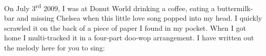 On July 3\textsuperscript{rd} 2009, I was at Donut World drinking a coffee,
eating a buttermilk-bar and missing Chelsea when this little love song
popped into my head. I quickly scrawled it on the back of a piece of paper
I found in my pocket. When I got home I multi-tracked it in a four-part
doo-wop arrangement. I have written out the melody here for you to sing:
\bigskip

